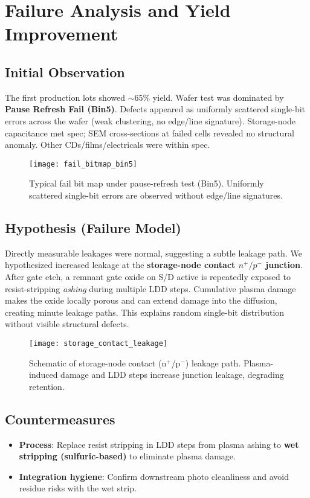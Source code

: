 \section{Failure Analysis and Yield Improvement}

\subsection{Initial Observation}
The first production lots showed $\sim$65\% yield. Wafer test was dominated by \textbf{Pause Refresh Fail (Bin5)}. Defects appeared as uniformly scattered single-bit errors across the wafer (weak clustering, no edge/line signature). Storage-node capacitance met spec; SEM cross-sections at failed cells revealed no structural anomaly. Other CDs/films/electricals were within spec.

\begin{figure}[t]
  \centering
  \texttt{[image: fail\_bitmap\_bin5]}
  \caption{Typical fail bit map under pause-refresh test (Bin5).
  Uniformly scattered single-bit errors are observed without edge/line signatures.}
  \label{fig:fail_bitmap}
\end{figure}

\subsection{Hypothesis (Failure Model)}
Directly measurable leakages were normal, suggesting a subtle leakage path. We hypothesized increased leakage at the \textbf{storage-node contact $n^+/p^-$ junction}. After gate etch, a remnant gate oxide on S/D active is repeatedly exposed to resist-stripping \emph{ashing} during multiple LDD steps. Cumulative plasma damage makes the oxide locally porous and can extend damage into the diffusion, creating minute leakage paths. This explains random single-bit distribution without visible structural defects.

\begin{figure}[t]
  \centering
  \texttt{[image: storage\_contact\_leakage]}
  \caption{Schematic of storage-node contact (n$^+$/p$^-$) leakage path.
  Plasma-induced damage and LDD steps increase junction leakage, degrading retention.}
  \label{fig:storage_contact}
\end{figure}

\subsection{Countermeasures}
\begin{itemize}
  \item \textbf{Process}: Replace resist stripping in LDD steps from plasma ashing to \textbf{wet stripping (sulfuric-based)} to eliminate plasma damage. 
  \item \textbf{Integration hygiene}: Confirm downstream photo cleanliness and avoid residue risks with the wet strip.
\end{itemize}

